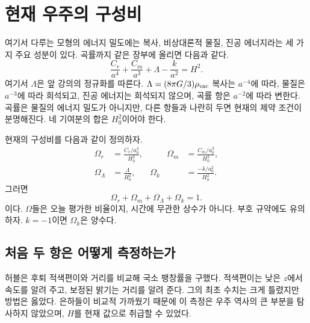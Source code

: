 \section{현재 우주의 구성비}

여기서 다루는 모형의 에너지 밀도에는 복사, 비상대론적 물질, 진공 에너지라는 세 가지 주요 성분이 있다. 곡률까지 같은 장부에 올리면 다음과 같다.
\begin{equation}
\frac{C_r}{a^4}
+\frac{C_m}{a^3}
+\Lambda
-\frac{k}{a^2}
=H^2.
\label{eq:c06-budget}
\end{equation}
여기서 \(\Lambda\)은 앞 강의의 정규화를 따른다. \(\Lambda=(8\pi G/3)\rho_{\rm vac}\) 복사는 \(a^{-4}\)에 따라, 물질은 \(a^{-3}\)에 따라 희석되고, 진공 에너지는 희석되지 않으며, 곡률 항은 \(a^{-2}\)에 따라 변한다. 곡률은 물질의 에너지 밀도가 아니지만, 다른 항들과 나란히 두면 현재의 제약 조건이 분명해진다. 네 기여분의 합은 \(H_0^2\)이어야 한다.

현재의 구성비를 다음과 같이 정의하자.
\begin{equation}
\begin{aligned}
\Omega_r&=\frac{C_r/a_0^4}{H_0^2},
&\qquad
\Omega_m&=\frac{C_m/a_0^3}{H_0^2},\\
\Omega_\Lambda&=\frac{\Lambda}{H_0^2},
&
\Omega_k&=\frac{-k/a_0^2}{H_0^2}.
\end{aligned}
\label{eq:c06-omegas}
\end{equation}
그러면
\begin{equation}
\boxed{\Omega_r+\Omega_m+\Omega_\Lambda+\Omega_k=1.}
\label{eq:c06-sum-rule}
\end{equation}
이다. \(\Omega\)들은 오늘 평가한 비율이지, 시간에 무관한 상수가 아니다. 부호 규약에도 유의하자. \(k=-1\)이면 \(\Omega_k\)은 양수다.

\subsection{처음 두 항은 어떻게 측정하는가}

허블은 후퇴 적색편이와 거리를 비교해 국소 팽창률을 구했다. 적색편이는 낮은 \(z\)에서 속도를 알려 주고, 보정된 밝기는 거리를 알려 준다. 그의 최초 수치는 크게 틀렸지만 방법은 옳았다. 은하들이 비교적 가까웠기 때문에 이 측정은 우주 역사의 큰 부분을 탐사하지 않았으며, \(H\)를 현재 값으로 취급할 수 있었다.

\begin{classroomqa}
\end{classroomqa}

